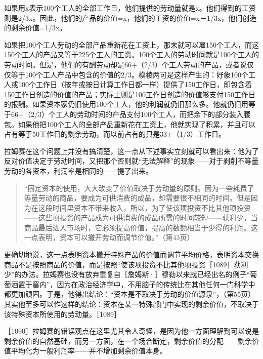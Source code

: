 如果用x表示100个工人的全部工作日，他们提供的劳动量就是x。他们得到的工资则是2/3x。因此，他们的产品的价值=x，他们的工资的价值=x－1/3x，他们创造的剩余价值=1/3x。

如果把100个工人劳动的全部产品重新花在工资上，那末就可以雇150个工人，而这150个工人的产品又等于225个工人的工资。100个工人的劳动时间就是100个工人的劳动时间。但是，他们的有酬劳动却是66+（2/3）个工人劳动的产品，或者说仅仅等于100个工人产品中包含的价值的2/3。模棱两可是这样产生的：好象100个工人或100个工作日（按年或按日计算工作日都一样）提供了150工作日，即包含着150工作日创造的价值的产品；实际上则是100工作日创造的价值够支付150工作日的报酬。如果资本家仍旧使用100个工人，他的利润就仍旧那么多。他就仍旧用等于66+（2/3）个工人的劳动时间的产品支付100个工人，而把余下的部分装入腰包。如果他把100个工人的全部产品重新花在工资上，他就实现了积累，并且可以占有等于50工作日的剩余劳动，而以前占有的只是33+（1/3）工作日。

拉姆赛在这个问题上并没有搞清楚，这一点从下述事实立刻就可以看出来：他为了反对价值决定于劳动时间，又把那个否则就“无法解释”的现象——对于剥削不等量劳动的各资本，利润率是相同的——提了出来。

\begin{quote}{“固定资本的使用，大大改变了价值取决于劳动量的原则。因为一些耗费了等量劳动的商品，要成为可供消费的成品，却需要很不相同的时间。但是因为在这段时间里资本不带来收入，所以，为了使该项投资不比其他项投资——这些项投资的产品成为可供消费的成品所需的时间较短——获利少，当商品最后进入市场时，它必须提高价值，提高的数额相当于少得的利润。这一点表明，资本可以撇开劳动而调节价值。”（第43页）}\end{quote}

更确切地说，这一点表明资本撇开特殊产品的价值而调节平均价格，表明资本交换商品不是按照商品的价值，而是按照“使该项投资不比其他项投资［1089］获利少”的办法。拉姆赛也没有放弃重复自［詹姆斯·］穆勒以来就已经出名的例子“葡萄酒置于窖内”，因为在政治经济学中，不用脑子的传统比在其他任何一门科学中都更加顽固。于是，他得出结论：“资本是不取决于劳动的价值源泉”，（第55页）其实他至多可以作这样的结论：资本在某一特殊部门中实现的剩余价值，不取决于该特殊资本所使用的劳动量。［1089］

［1090］拉姆赛的错误观点在这里尤其令人奇怪，是因为他一方面理解到可以说是剩余价值的自然基础，而另一方面，在一个场合断定，剩余价值的分配——剩余价值平均化为一般利润率——并不增加剩余价值本身。

